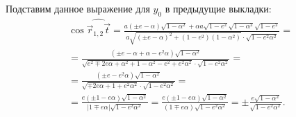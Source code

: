Подставим данное выражение для $y_0$ в предыдущие выкладки:
\begin{multline*}
    \cos \widehat{\vec r_{1, 2}  \vec t}
    = \frac{a ( \pm e - \alpha) \sqrt{1 - \alpha^2} + \alpha a \sqrt{1 - e^2} \sqrt{1 - \alpha^2} \sqrt{1 - e^2}}{a \sqrt{(\pm e - \alpha)^2 + (1 - e^2)(1 - \alpha^2)} \cdot \sqrt{1 - e^2 \alpha^2}} = \\
    = \frac{ (\pm e - \alpha + \alpha - e^2 \alpha) \sqrt{1 - \alpha^2}}{\sqrt{e^2 \mp 2 e\alpha + \alpha^2 + 1 - \alpha^2 - e^2 + e^2 \alpha^2} \cdot \sqrt{1 - e^2 \alpha^2}} = \\
    = \frac{ (\pm e - e^2 \alpha) \sqrt{1 - \alpha^2}}{\sqrt{\mp 2 e\alpha + 1  + e^2 \alpha^2} \cdot \sqrt{1 - e^2 \alpha^2}} = \\
    = \frac{ e(\pm 1 - e \alpha) \sqrt{1 - \alpha^2}}{|1 \mp e\alpha| \sqrt{1 - e^2 \alpha^2}}
    = \frac{ e(\pm 1 - e \alpha) \sqrt{1 - \alpha^2}}{(1 \mp e\alpha) \sqrt{1 - e^2 \alpha^2}}
    = \pm \frac{e \sqrt{1 - \alpha^2}}{\sqrt{1 - e^2 \alpha^2}}.
\end{multline*}

